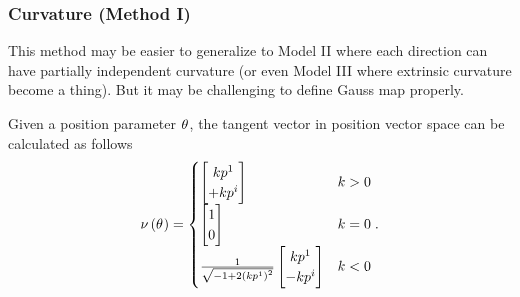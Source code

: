 \documentclass[stu, babel, american, biblatex, a4paper, draftall]{apa7}
\begin{document}
\subsubsection{Curvature (Method I)}
This method may be easier to generalize to
Model II where each direction can have partially independent curvature
(or even Model III where extrinsic curvature become a thing).
But it may be challenging to define Gauss map properly.
\begin{lemma}\label{Model:NormalVector}
    Given a position parameter $\tensor{\theta}{}$,
    the tangent vector in position vector space can be calculated as follows
    \begin{equation*}
        \nu\left(\tensor{\theta}{}\right)
        =
        \begin{cases}
            \begin{bmatrix}
                k\tensor{p}{^1}  \\
                +k\tensor{p}{^i} \\
            \end{bmatrix} & k>0 \\
            \begin{bmatrix}
                1 \\
                0 \\
            \end{bmatrix} & k=0 \\
            \frac{1}{\sqrt{-1+2\left(k\tensor{p}{^1}\right)^2}}
            \begin{bmatrix}
                k\tensor{p}{^1}  \\
                -k\tensor{p}{^i} \\
            \end{bmatrix} & k<0
        \end{cases}
        \text{.}
    \end{equation*}
\end{lemma}
\end{document}
